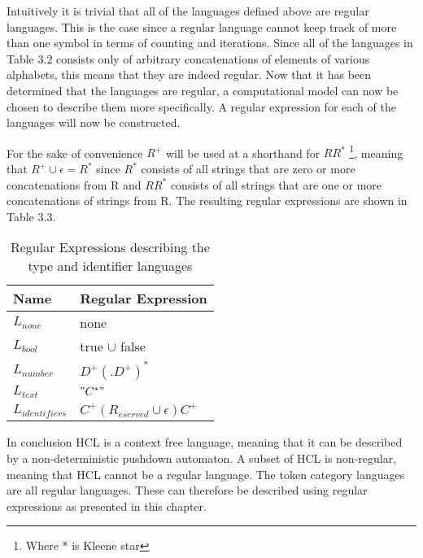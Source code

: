 Intuitively it is trivial that all of the languages defined above are regular languages.
This is the case since a regular language cannot keep track of more than one symbol in terms of counting and iterations.
Since all of the languages in Table 3.2 consists only of arbitrary concatenations of elements of various alphabets, this means that they are indeed regular. 
Now that it has been determined that the languages are regular, a computational model can now be chosen to describe them more specifically.
A regular expression for each of the languages will now be constructed.

For the sake of convenience $R^+$ will be used at a shorthand for $RR^*$ \footnote{Where * is Kleene star}, meaning that $R^+ \cup \epsilon = R^*$ since $R^*$ consists of all strings that are zero or more concatenations from R and $RR^*$ consists of all strings that are one or more concatenations of strings from R.
The resulting regular expressions are shown in Table 3.3.

\begin{table}[!htb]
	\centering
	\label{my-label}
	\begin{tabular}{|l|l|}
		\hline
		\textbf{Name}     & \textbf{Regular Expression}         \\ \hline
		$L_{none}$        & none                                \\ \hline
		$L_{bool}$        & true $\cup$ false                   \\ \hline
		$L_{number}$      & $D^+(.D^+)^*$                       \\ \hline
		$L_{text}$        & $"C^*"$                               \\ \hline
		$L_{identifiers}$ & $C^+(R_{eserved} \cup \epsilon)C^+$ \\ \hline
	\end{tabular}
	\caption{Regular Expressions describing the type and identifier languages}
\end{table}

In conclusion HCL is a context free language, meaning that it can be described by a non-deterministic pushdown automaton.
A subset of HCL is non-regular, meaning that HCL cannot be a regular language.
The token category languages are all regular languages. 
These can therefore be described using regular expressions as presented in this chapter.



